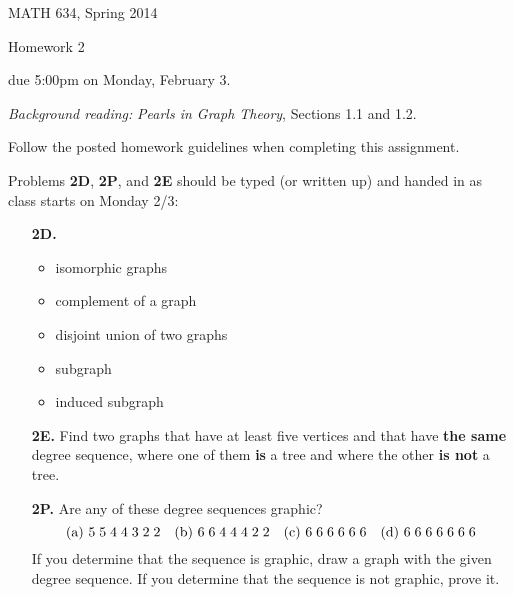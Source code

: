 \documentclass[12pt]{article}
\begin{document}
\pagestyle{empty}

\begin{center}\large 
MATH 634, Spring 2014

{\sc Homework 2}

due 5:00{\sc pm} on Monday, February 3.
\end{center}

\noindent
{\em Background reading:} {\em Pearls in Graph Theory}, Sections 1.1 and 1.2.

\smallskip\noindent
{\color{red} Follow the posted homework guidelines when completing this assignment.}

\smallskip\noindent
Problems {\bf 2D}, {\bf 2P}, and {\bf 2E} should be typed (or written up) and handed in as class starts on Monday 2/3:

\begin{enumerate}
\item[\bf 2D.]  

\begin{itemize}
\item isomorphic graphs
\item complement of a graph
\item disjoint union of two graphs
\item subgraph
\item induced subgraph
\end{itemize}

\item[\bf 2E.]  
Find two graphs that have at least five vertices and that have {\bf the same} degree sequence, where one of them {\bf is} a tree and where the other {\bf is not} a tree.


\item[\bf 2P.]  
Are any of these degree sequences graphic?  
\[\textup{(a) } 5\;5\;4\;4\;3\;2\;2 \textup{ ~~(b) } 6\;6\;4\;4\;4\;2\;2 \textup{ ~~(c) } 6\;6\;6\;6\;6\;6
\textup{ ~~(d) } 6\;6\;6\;6\;6\;6\;6 \]
If you determine that the sequence is graphic, draw a graph with the given degree sequence. If you determine that the sequence is not graphic, prove it.

\end{enumerate}
\end{document}
